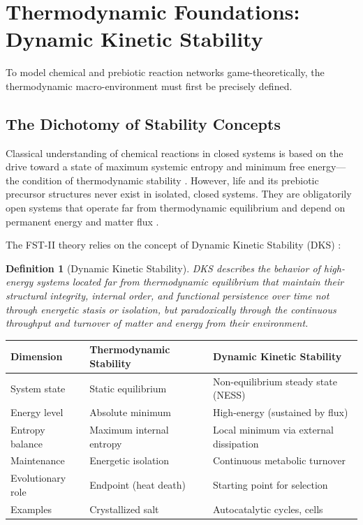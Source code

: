 \documentclass[12pt,a4paper]{article}
\newtheorem{definition}{Definition}
\theoremstyle{remark}
\begin{document}
\section{Thermodynamic Foundations: Dynamic Kinetic Stability}
\label{sec:thermodynamics}

To model chemical and prebiotic reaction networks game-theoretically, the thermodynamic macro-environment must first be precisely defined.

\subsection{The Dichotomy of Stability Concepts}

Classical understanding of chemical reactions in closed systems is based on the drive toward a state of maximum systemic entropy and minimum free energy---the condition of thermodynamic stability \citep{Pross2012}. However, life and its prebiotic precursor structures never exist in isolated, closed systems. They are obligatorily open systems that operate far from thermodynamic equilibrium and depend on permanent energy and matter flux \citep{Bioenergetics}.

The FST-II theory relies on the concept of Dynamic Kinetic Stability (DKS) \citep{Pross2012}:

\begin{definition}[Dynamic Kinetic Stability]
DKS describes the behavior of high-energy systems located far from thermodynamic equilibrium that maintain their structural integrity, internal order, and functional persistence over time not through energetic stasis or isolation, but paradoxically through the continuous throughput and turnover of matter and energy from their environment.
\end{definition}

\begin{center}
\begin{tabular}{lll}
\toprule
\textbf{Dimension} & \textbf{Thermodynamic Stability} & \textbf{Dynamic Kinetic Stability} \\
\midrule
System state & Static equilibrium & Non-equilibrium steady state (NESS) \\
Energy level & Absolute minimum & High-energy (sustained by flux) \\
Entropy balance & Maximum internal entropy & Local minimum via external dissipation \\
Maintenance & Energetic isolation & Continuous metabolic turnover \\
Evolutionary role & Endpoint (heat death) & Starting point for selection \\
Examples & Crystallized salt & Autocatalytic cycles, cells \\
\bottomrule
\end{tabular}
\end{center}
\end{document}
